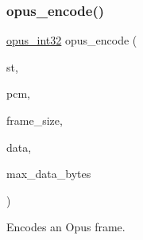 \subsubsection{\texorpdfstring{opus\+\_\+encode()}{opus\_encode()}}
{\footnotesize\ttfamily \hyperlink{opus__types_8h_aa4d309d6f80b99dbabebc8f98879ab9a}{opus\+\_\+int32} opus\+\_\+encode (\begin{DoxyParamCaption}\item[{\hyperlink{group__opus__encoder_gaf461a3ef2f10c2fe8b994a176f06c9bd}{Opus\+Encoder} $\ast$}]{st,  }\item[{const \hyperlink{opus__types_8h_acc9ed7cf60479eb81f9648c6ec27dc26}{opus\+\_\+int16} $\ast$}]{pcm,  }\item[{int}]{frame\+\_\+size,  }\item[{unsigned char $\ast$}]{data,  }\item[{\hyperlink{opus__types_8h_aa4d309d6f80b99dbabebc8f98879ab9a}{opus\+\_\+int32}}]{max\+\_\+data\+\_\+bytes }\end{DoxyParamCaption})}



Encodes an Opus frame. 


